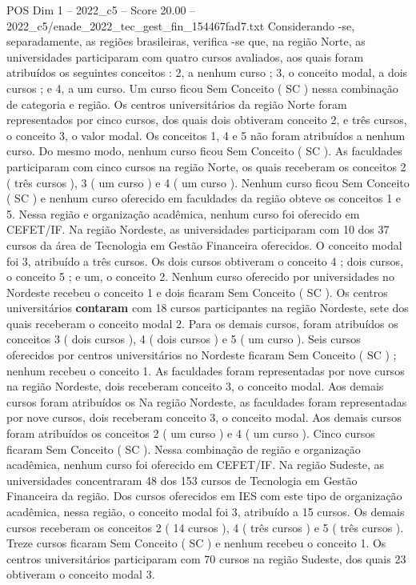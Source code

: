 \begin{textsample}{POS Dim 1 – 2022\_c5 – Score 20.00 – 2022\_c5/enade\_2022\_tec\_gest\_fin\_154467fad7.txt}
Considerando -se, separadamente, as regiões brasileiras, verifica -se que, na região Norte, as universidades participaram com quatro cursos avaliados, aos quais foram atribuídos os seguintes conceitos : 2, a nenhum curso ; 3, o conceito modal, a dois cursos ; e 4, a um curso.
Um curso ficou Sem Conceito ( SC ) nessa combinação de categoria e região.
Os centros universitários da região Norte foram representados por cinco cursos, dos quais dois obtiveram conceito 2, e três cursos, o conceito 3, o valor modal.
Os conceitos 1, 4 e 5 não foram atribuídos a nenhum curso.
Do mesmo modo, nenhum curso ficou Sem Conceito ( SC ).
As faculdades participaram com cinco cursos na região Norte, os quais receberam os conceitos 2 ( três cursos ), 3 ( um curso ) e 4 ( um curso ).
Nenhum curso ficou Sem Conceito ( SC ) e nenhum curso oferecido em faculdades da região obteve os conceitos 1 e 5.
Nessa região e organização acadêmica, nenhum curso foi oferecido em CEFET/IF.
Na região Nordeste, as universidades participaram com 10 dos 37 cursos da área de Tecnologia em Gestão Financeira oferecidos.
O conceito modal foi 3, atribuído a três cursos.
Os dois cursos obtiveram o conceito 4 ; dois cursos, o conceito 5 ; e um, o conceito 2.
Nenhum curso oferecido por universidades no Nordeste recebeu o conceito 1 e dois ficaram Sem Conceito ( SC ).
Os centros universitários \textbf{contaram} com 18 cursos participantes na região Nordeste, sete dos quais receberam o conceito modal 2.
Para os demais cursos, foram atribuídos os conceitos 3 ( dois cursos ), 4 ( dois cursos ) e 5 ( um curso ).
Seis cursos oferecidos por centros universitários no Nordeste ficaram Sem Conceito ( SC ) ; nenhum recebeu o conceito 1.
As faculdades foram representadas por nove cursos na região Nordeste, dois receberam conceito 3, o conceito modal.
Aos demais cursos foram atribuídos os Na região Nordeste, as faculdades foram representadas por nove cursos, dois receberam conceito 3, o conceito modal.
Aos demais cursos foram atribuídos os conceitos 2 ( um curso ) e 4 ( um curso ).
Cinco cursos ficaram Sem Conceito ( SC ).
Nessa combinação de região e organização acadêmica, nenhum curso foi oferecido em CEFET/IF.
Na região Sudeste, as universidades concentraram 48 dos 153 cursos de Tecnologia em Gestão Financeira da região.
Dos cursos oferecidos em IES com este tipo de organização acadêmica, nessa região, o conceito modal foi 3, atribuído a 15 cursos.
Os demais cursos receberam os conceitos 2 ( 14 cursos ), 4 ( três cursos ) e 5 ( três cursos ).
Treze cursos ficaram Sem Conceito ( SC ) e nenhum recebeu o conceito 1.
Os centros universitários participaram com 70 cursos na região Sudeste, dos quais 23 obtiveram o conceito modal 3.

\end{textsample}
